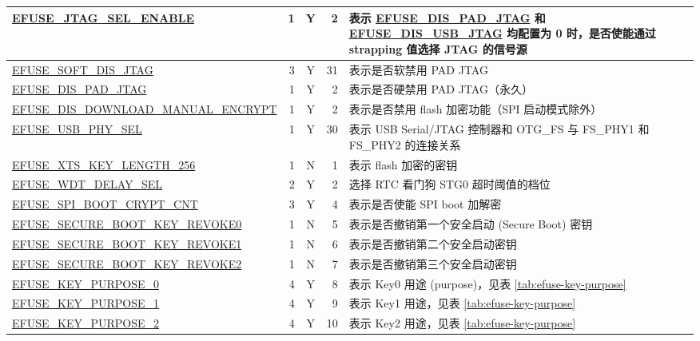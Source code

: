 \begin{longtable}[l]{ |m{8.2cm}|r|c|r|m{9.3cm}| }
    \hline
    \hyperref[fielddesc:EFUSEJTAGSELENABLE]{EFUSE\_JTAG\_SEL\_ENABLE} & 1 & Y & 2 & 表示 \hyperref[fielddesc:EFUSEDISPADJTAG]{EFUSE\_DIS\_PAD\_JTAG} 和 \hyperref[fielddesc:EFUSEDISUSBJTAG]{EFUSE\_DIS\_USB\_JTAG} 均配置为 0 时，是否使能通过 strapping 值选择 JTAG 的信号源\\
    \hline
    \hyperref[fielddesc:EFUSESOFTDISJTAG]{EFUSE\_SOFT\_DIS\_JTAG} & 3 & Y & 31 & 表示是否软禁用 PAD JTAG\\
    \hline
    \hyperref[fielddesc:EFUSEDISPADJTAG]{EFUSE\_DIS\_PAD\_JTAG} & 1 & Y & 2 & 表示是否硬禁用 PAD JTAG（永久） \\
    \hline
    \hyperref[fielddesc:EFUSEDISDOWNLOADMANUALENCRYPT]{EFUSE\_DIS\_DOWNLOAD\_MANUAL\_ENCRYPT} &  1 & Y & 2 & 表示是否禁用 flash 加密功能（SPI 启动模式除外）\\
    \hline
    \hyperref[fielddesc:EFUSEUSBPHYSEL]{EFUSE\_USB\_PHY\_SEL} &  1 & Y & 30 & 表示 USB Serial/JTAG 控制器和 OTG\_FS 与 FS\_PHY1 和 FS\_PHY2 的连接关系\\
    \hline
    \hyperref[fielddesc:EFUSEXTSKEYLENGTH256]{EFUSE\_XTS\_KEY\_LENGTH\_256} &  1 & N & 1 & 表示 flash 加密的密钥\\
    \hline
    \hyperref[fielddesc:EFUSEWDTDELAYSEL]{EFUSE\_WDT\_DELAY\_SEL} & 2 & Y & 2 & 选择 RTC 看门狗 STG0 超时阈值的档位 \\
    \hline
    \hyperref[fielddesc:EFUSESPIBOOTCRYPTCNT]{EFUSE\_SPI\_BOOT\_CRYPT\_CNT} & 3 & Y & 4 & 表示是否使能 SPI boot 加解密\\
    \hline
    \hyperref[fielddesc:EFUSESECUREBOOTKEYREVOKE0]{EFUSE\_SECURE\_BOOT\_KEY\_REVOKE0} & 1 & N & 5 & 表示是否撤销第一个安全启动 (Secure Boot) 密钥 \\
    \hline
    \hyperref[fielddesc:EFUSESECUREBOOTKEYREVOKE1]{EFUSE\_SECURE\_BOOT\_KEY\_REVOKE1} & 1 & N & 6 & 表示是否撤销第二个安全启动密钥 \\
    \hline
    \hyperref[fielddesc:EFUSESECUREBOOTKEYREVOKE2]{EFUSE\_SECURE\_BOOT\_KEY\_REVOKE2} & 1 & N & 7 & 表示是否撤销第三个安全启动密钥 \\
    \hline
    \hyperref[fielddesc:EFUSEKEYPURPOSE0]{EFUSE\_KEY\_PURPOSE\_0} & 4 & Y & 8 & {表示 Key0 用途 (purpose)，见表 \ref{tab:efuse-key-purpose}} \\
    \hline
    \hyperref[fielddesc:EFUSEKEYPURPOSE1]{EFUSE\_KEY\_PURPOSE\_1} & 4 & Y & 9 & {表示 Key1 用途，见表 \ref{tab:efuse-key-purpose}} \\
    \hline
    \hyperref[fielddesc:EFUSEKEYPURPOSE2]{EFUSE\_KEY\_PURPOSE\_2} & 4 & Y & 10 & {表示 Key2 用途，见表 \ref{tab:efuse-key-purpose}} \\

\end{longtable}
